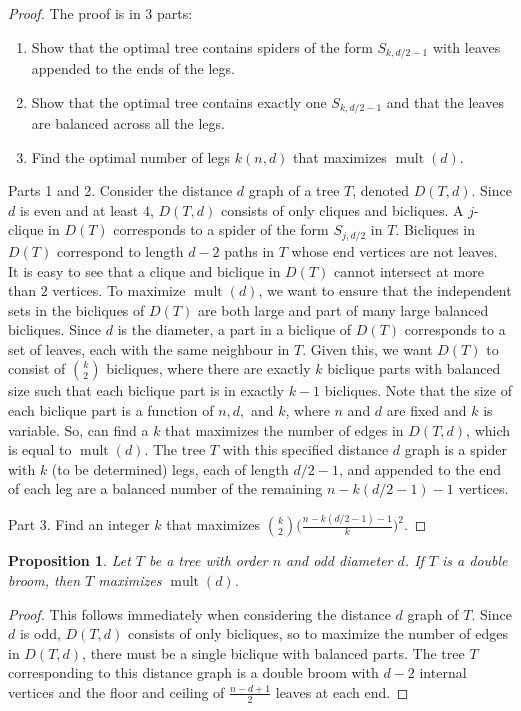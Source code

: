 \documentclass[12]{article}
\DeclareMathOperator{\mult}{mult}
\newtheorem{prop}[thm]{Proposition}
\theoremstyle{definition}
\begin{document}
	\begin{proof}
		The proof is in 3 parts:
		\begin{enumerate}
			\item Show that the optimal tree contains spiders of the form $S_{k,d/2-1}$ with leaves appended to the ends of the legs.
			\item Show that the optimal tree contains exactly one $S_{k,d/2-1}$ and that the leaves are balanced across all the legs.
			\item Find the optimal number of legs $k(n,d)$ that maximizes $\mult(d)$.
		\end{enumerate}
	
		Parts 1 and 2.  Consider the distance $d$ graph of a tree $T$, denoted $D(T,d)$.  Since $d$ is even and at least $4$, $D(T,d)$ consists of only cliques and bicliques.  A $j$-clique in $D(T)$ corresponds to a spider of the form $S_{j,d/2}$ in $T$.  Bicliques in $D(T)$ correspond to length $d-2$ paths in $T$ whose end vertices are not leaves.  It is easy to see that a clique and biclique in $D(T)$ cannot intersect at more than $2$ vertices.  To maximize $\mult(d)$, we want to ensure that the independent sets in the bicliques of $D(T)$ are both large and part of many large balanced bicliques.  Since $d$ is the diameter, a part in a biclique of $D(T)$ corresponds to a set of leaves, each with the same neighbour in $T$.  Given this, we want $D(T)$ to consist of ${k \choose 2}$ bicliques, where there are exactly $k$ biclique parts with balanced size such that each biclique part is in exactly $k-1$ bicliques.  Note that the size of each biclique part is a function of $n, d,$ and $k$, where $n$ and $d$ are fixed and $k$ is variable.  So, can find a $k$ that maximizes the number of edges in $D(T,d)$, which is equal to $\mult(d)$.  The tree $T$ with this specified distance $d$ graph is a spider with $k$ (to be determined) legs, each of length $d/2 -1$, and appended to the end of each leg are a balanced number of the remaining $n - k(d/2-1)-1$ vertices.
		
		Part 3.  Find an integer $k$ that maximizes ${k \choose 2} \big(\frac{n-k(d/2-1)-1}{k} \big)^2$.
	\end{proof}

	\begin{prop}
		Let $T$ be a tree with order $n$ and odd diameter $d$.  If $T$ is a double broom, then $T$ maximizes $\mult(d)$.
	\end{prop}

	\begin{proof}
		This follows immediately when considering the distance $d$ graph of $T$.  Since $d$ is odd, $D(T,d)$ consists of only bicliques, so to maximize the number of edges in $D(T,d)$, there must be a single biclique with balanced parts.  The tree $T$ corresponding to this distance graph is a double broom with $d-2$ internal vertices and the floor and ceiling of $\frac{n-d+1}{2}$ leaves at each end.
	\end{proof}
\end{document}

